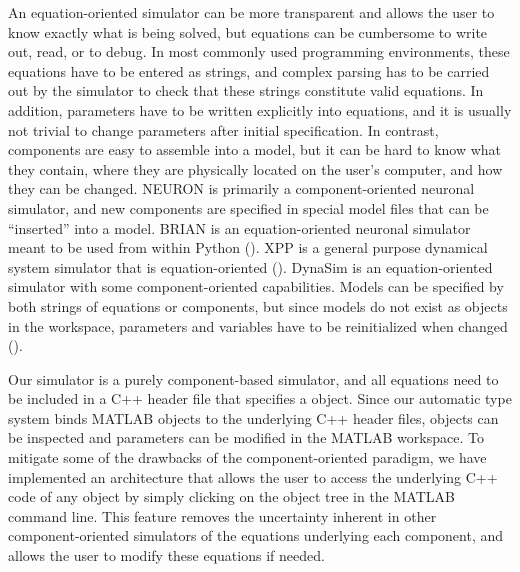 \documentclass{frontiersSCNS} %
\begin{document}
An equation-oriented simulator can be more transparent and allows the user to know exactly what is being solved, but equations can be cumbersome to write out, read, or to debug. In most commonly used programming environments, these equations have to be entered as strings, and complex parsing has to be carried out by the simulator to check that these strings constitute valid equations. In addition, parameters have to be written explicitly into equations, and it is usually not trivial to change parameters after initial specification. In contrast, components are easy to assemble into a model, but it can be hard to know what they contain, where they are physically located on the user's computer, and how they can be changed. NEURON is primarily a component-oriented neuronal simulator, and new components are specified in special model files that can be ``inserted'' into a model. BRIAN is an equation-oriented neuronal simulator meant to be used from within Python (\cite{goodmanBrianSimulator2009}). XPP is a general purpose dynamical system simulator that is equation-oriented (\cite{ermentrout2002simulating}). DynaSim is an equation-oriented simulator with some component-oriented capabilities. Models can be specified by both strings of equations or components, but since models do not exist as objects in the workspace, parameters and variables have to be reinitialized when changed (\cite{sherfeyDynaSimMATLABToolbox2018}). 

Our simulator is a purely component-based simulator, and all equations need to be included in a C++ header file that specifies a object. Since our automatic type system binds MATLAB objects to the underlying C++ header files, objects can be inspected and parameters can be modified in the MATLAB workspace. To mitigate some of the drawbacks of the component-oriented paradigm, we have implemented an architecture that allows the user to access the underlying C++ code of any object by simply clicking on the object tree in the MATLAB command line. This feature removes the uncertainty inherent in other component-oriented simulators of the equations underlying each component, and allows the user to modify these equations if needed. 
\end{document}
